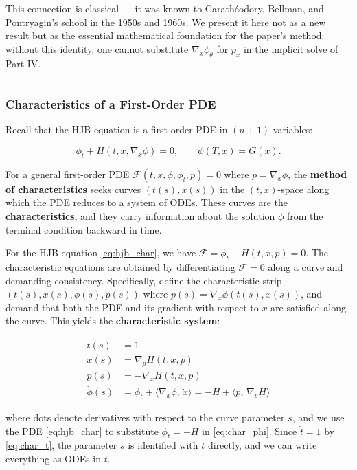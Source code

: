 \documentclass{article}
\begin{document}
This connection is classical --- it was known to Carathéodory, Bellman, and
Pontryagin's school in the 1950s and 1960s. We present it here not as a new
result but as the essential mathematical foundation for the paper's method:
without this identity, one cannot substitute $\nabla_x \phi_\theta$ for $p_x$
in the implicit solve of Part IV.

\medskip\hrule\medskip

\subsubsection{Characteristics of a First-Order PDE}

Recall that the HJB equation is a first-order PDE in $(n+1)$ variables:

\begin{equation}
    \phi_t + H(t, x, \nabla_x \phi) = 0, \qquad \phi(T, x) = G(x).
    \label{eq:hjb_char}
\end{equation}

For a general first-order PDE $\mathcal{F}(t, x, \phi, \phi_t, p) = 0$ where
$p = \nabla_x \phi$, the \textbf{method of characteristics} seeks curves
$(t(s), x(s))$ in the $(t,x)$-space along which the PDE reduces to a system
of ODEs. These curves are the \textbf{characteristics}, and they carry
information about the solution $\phi$ from the terminal condition backward
in time.

For the HJB equation \eqref{eq:hjb_char}, we have $\mathcal{F} = \phi_t +
H(t, x, p) = 0$. The characteristic equations are obtained by differentiating
$\mathcal{F} = 0$ along a curve and demanding consistency. Specifically, define
the characteristic strip $(t(s), x(s), \phi(s), p(s))$ where $p(s) =
\nabla_x \phi(t(s), x(s))$, and demand that both the PDE and its gradient with
respect to $x$ are satisfied along the curve. This yields the
\textbf{characteristic system}:

\begin{align}
    \dot{t}(s)   &= 1
    \label{eq:char_t}\\
    \dot{x}(s)   &= \nabla_p H(t, x, p)
    \label{eq:char_x}\\
    \dot{p}(s)   &= -\nabla_x H(t, x, p)
    \label{eq:char_p}\\
    \dot{\phi}(s) &= \phi_t + \langle \nabla_x\phi,\, \dot{x} \rangle
                  = -H + \langle p,\, \nabla_p H \rangle
    \label{eq:char_phi}
\end{align}

where dots denote derivatives with respect to the curve parameter $s$, and
we use the PDE \eqref{eq:hjb_char} to substitute $\phi_t = -H$ in
\eqref{eq:char_phi}. Since $\dot{t} = 1$ by \eqref{eq:char_t}, the parameter
$s$ is identified with $t$ directly, and we can write everything as ODEs in
$t$.
\end{document}
